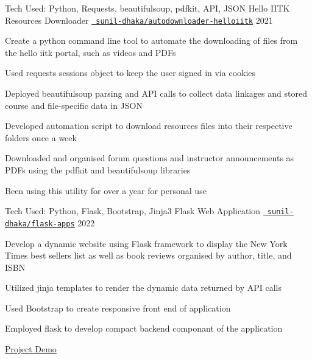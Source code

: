 
\begin{cventries}
  \cventry
  {Tech Used: Python, Requests, beautifulsoup, pdfkit, API, JSON}
  {Hello IITK Resources Downloader}
  {\texttt{\href{https://github.com/sunil-dhaka/autodownloader-helloiitk}{\faGithub{} sunil-dhaka/autodownloader-helloiitk}}}
  {2021}
  {
    \begin{cvitems}
      \item Create a python command line tool to automate the downloading of files from the hello iitk portal, such as videos and PDFs 
      \item Used requests sessions object to keep the user signed in via cookies
      \item Deployed beautifulsoup parsing and API calls to collect data linkages and stored course and file-specific data in JSON
      \item Developed automation script to download resources files into their respective folders once a week
      \item Downloaded and organised forum questions and instructor announcements as PDFs using the pdfkit and beautifulsoup libraries
      \item Been using this utility for over a year for personal use
    \end{cvitems}
  }
  
  \cventry
  {Tech Used: Python, Flask, Bootstrap, Jinja3}
  {Flask Web Application}
  {\texttt{\href{https://github.com/sunil-dhaka/flask-apps}{\faGithub{} sunil-dhaka/flask-apps}}}
  {2022}
  {
    \begin{cvitems}
    \item Develop a dynamic website using Flask framework to display the New York Times best sellers list as well as book reviews organised by author, title, and ISBN
    \item Utilized jinja templates to render the dynamic data returned by API calls
    \item Used Bootstrap to create responsive front end of application
    \item Employed flask to develop compact backend componant of the application
    \item \href{https://www.youtube.com/watch?v=JlubCZitXRE}{Project Demo}
    \end{cvitems}
  }
\end{cventries}
\vspace{-2mm}
